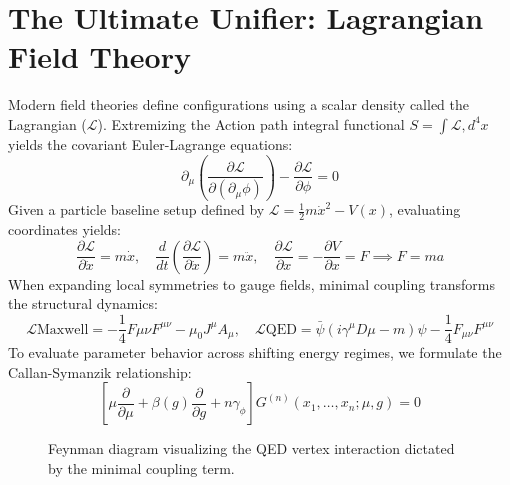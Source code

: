 \documentclass[11pt,a4paper]{article}
\begin{document}
\section{The Ultimate Unifier: Lagrangian Field Theory}
Modern field theories define configurations using a scalar density called the Lagrangian ($\mathcal{L}$). Extremizing the Action path integral functional $S = \int \mathcal{L} , d^4x$ yields the covariant Euler-Lagrange equations:
\begin{equation}
\partial_\mu \left( \frac{\partial \mathcal{L}}{\partial(\partial_\mu \phi)} \right) - \frac{\partial \mathcal{L}}{\partial \phi} = 0
\end{equation}
Given a particle baseline setup defined by $\mathcal{L} = \frac{1}{2}m\dot{x}^2 - V(x)$, evaluating coordinates yields:
\begin{equation}
\frac{\partial \mathcal{L}}{\partial \dot{x}} = m\dot{x}, \quad \frac{d}{dt}\left(\frac{\partial \mathcal{L}}{\partial \dot{x}}\right) = m\ddot{x}, \quad \frac{\partial \mathcal{L}}{\partial x} = -\frac{\partial V}{\partial x} = F \implies F = ma
\end{equation}
When expanding local symmetries to gauge fields, minimal coupling transforms the structural dynamics:
\begin{equation}
\mathcal{L}{\text{Maxwell}} = -\frac{1}{4}F{\mu\nu}F^{\mu\nu} - \mu_0 J^\mu A_\mu, \quad \mathcal{L}{\text{QED}} = \bar{\psi}(i\gamma^\mu D{\mu} - m)\psi - \frac{1}{4}F_{\mu\nu}F^{\mu\nu}
\end{equation}
To evaluate parameter behavior across shifting energy regimes, we formulate the Callan-Symanzik relationship:
\begin{equation}
\left[ \mu \frac{\partial}{\partial \mu} + \beta(g) \frac{\partial}{\partial g} + n \gamma_{\phi} \right] G^{(n)}(x_1, \dots, x_n; \mu, g) = 0
\end{equation}
\begin{figure}[h!]
\centering
{}
\caption{Feynman diagram visualizing the QED vertex interaction dictated by the minimal coupling term.}
\end{figure}
\end{document}
